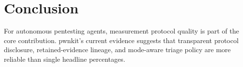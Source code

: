 \documentclass[11pt]{article}
\begin{document}
\section{Conclusion}

For autonomous pentesting agents, measurement protocol quality is part of the
core contribution. pwnkit's current evidence suggests that transparent protocol
disclosure, retained-evidence lineage, and mode-aware triage policy are more
reliable than single headline percentages.



\end{document}
